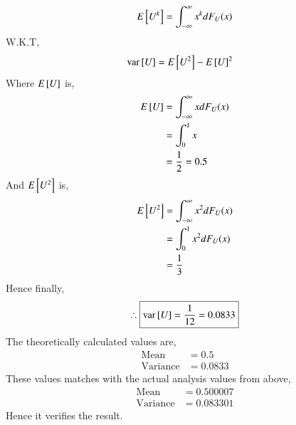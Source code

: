 \documentclass[journal,12pt,twocolumn]{IEEEtran}
\begin{document}
%
\begin{equation}
E{}\left[U^k\right] = \int_{-\infty}^{\infty}x^kdF_{U}(x)
\end{equation}
\solution 
W.K.T,
\begin{align}
    \text{var}{}\left[U\right] &= E{}\left[U^2\right]- E{}\left[U\right]^2
\end{align}
Where $E{}\left[U\right]$ is,
\begin{align}
   E{}\left[U\right]&=\int_{-\infty}^{\infty}xdF_U(x)\\
             &=\int_{0}^{1}x\\
             &=\frac{1}{2} = 0.5
\end{align}
And $E{}\left[U^2\right]$ is,
\begin{align}
    E{}\left[U^2\right]&=\int_{-\infty}^{\infty}x^{2}dF_U(x)\\
                &=\int_{0}^{1}x^{2}dF_U(x)\\
                &=\frac{1}{3}\\
\end{align}
Hence finally,
\begin{align}
    \therefore \boxed{\text{var}{}\left[U\right]=\frac{1}{12}=0.0833}
\end{align}
The theoretically calculated values are,
\begin{align}
    \text{Mean}&= 0.5  \\
    \text{Variance} &=  0.0833
\end{align}
These values matches with the actual analysis values from above,
\begin{align}
    \text{Mean}&= 0.500007  \\
    \text{Variance} &=  0.083301
\end{align}
Hence it verifies the result.
\end{document}
